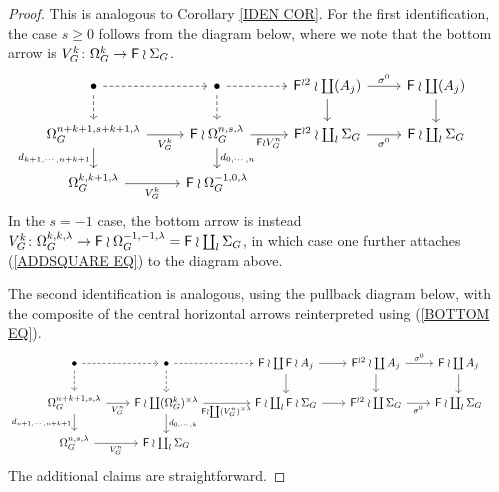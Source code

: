 \documentclass[a4paper,10pt]{article}%
\begin{document}
\begin{proof}
This is analogous to Corollary \ref{IDEN COR}. For the first identification, the case $s \geq 0$ follows from the diagram below, where we note that the bottom arrow is
$V_G^k \colon \Omega_G^k \to \mathsf{F} \wr \Sigma_G$.
\[
\begin{tikzcd}[row sep = 1.5em]
	\bullet \ar[dashed]{r} \ar[dashed]{d}&
	\bullet \ar[dashed]{r} \ar[dashed]{d}&
	\Fin^{\wr 2} \wr \coprod (A_j) \ar{r}{\sigma^0} \ar{d}&
	\Fin \wr \coprod (A_j) \ar{d}
\\
	\Omega_G^{n+k+1,s+k+1,\lambda} \ar{r}[swap]{V_G^k} \ar{d}[swap]{d_{k+1,\cdots,n+k+1}}&
	\Fin \wr \Omega^{n,s,\lambda}_G \ar{r}[swap]{\Fin \wr V_G^n} \ar{d}{d_{0,\cdots,n}}&
	\Fin^{\wr 2} \wr \coprod_l \Sigma_G \ar{r}[swap]{\sigma^0} &
	\Fin \wr \coprod_l \Sigma_G &
\\
	\Omega_G^{k,k+1,\lambda} \ar{r}[swap]{V_G^k} &
	\Fin \wr \Omega_G^{-1,0,\lambda}
\end{tikzcd}
\]
In the $s=-1$ case, the bottom arrow is instead 
$V_G^k \colon \Omega_G^{k,k,\lambda} \to 
\mathsf{F} \wr \Omega_G^{-1,-1,\lambda} =
\mathsf{F} \wr \coprod_l \Sigma_G$,
in which case one further attaches (\ref{ADDSQUARE EQ})
to the diagram above.

The second identification is analogous, using the pullback diagram below, with the composite of the central horizontal arrows reinterpreted using (\ref{BOTTOM EQ}).
\[
\begin{tikzcd}[row sep = 1.5em,column sep =2.05em]
	\bullet \ar[dashed]{r} \ar[dashed]{d}&
	\bullet \ar[dashed]{rr} \ar[dashed]{d}& &
	\Fin \wr \coprod \Fin \wr A_j \ar{r} \ar{d}&
	\Fin^{\wr 2} \wr \coprod A_j \ar{r}{\sigma^0} \ar{d}&
	\Fin \wr \coprod A_j \ar{d}
\\
	\Omega_G^{n+k+1,s,\lambda} \ar{r}[swap]{V_G^n} \ar{d}[swap]{d_{n+1,\cdots,n+k+1}}&
	\Fin \wr \coprod (\Omega^{k}_G)^{\times \lambda} \ar{rr}[swap]{\Fin \wr \coprod (V_G^n)^{\times \lambda}} \ar{d}{d_{0,\cdots,k}}&&
	\Fin \wr \coprod_l \Fin \wr \Sigma_G \ar{r} &
	\Fin^{\wr 2} \wr \coprod \Sigma_G \ar{r}[swap]{\sigma^0}  &
	\Fin \wr \coprod_l \Sigma_G &
\\
	\Omega_G^{n,s,\lambda} \ar{r}[swap]{V_G^n} &
	\Fin \wr \coprod_l \Sigma_G
\end{tikzcd}
\]
The additional claims are straightforward.
\end{proof}
\end{document}
